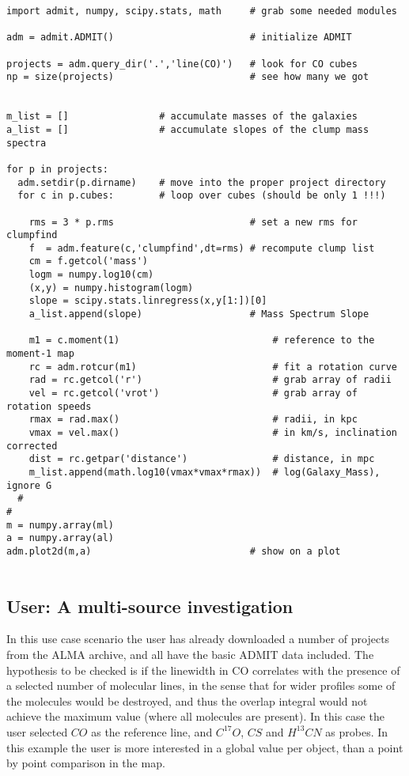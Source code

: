 \documentclass[preprint]{aastex} %
\begin{document}
\footnotesize
\begin{verbatim}
import admit, numpy, scipy.stats, math     # grab some needed modules

adm = admit.ADMIT()                        # initialize ADMIT

projects = adm.query_dir('.','line(CO)')   # look for CO cubes
np = size(projects)                        # see how many we got


m_list = []                # accumulate masses of the galaxies
a_list = []                # accumulate slopes of the clump mass spectra

for p in projects:
  adm.setdir(p.dirname)    # move into the proper project directory
  for c in p.cubes:        # loop over cubes (should be only 1 !!!)

    rms = 3 * p.rms                        # set a new rms for clumpfind
    f  = adm.feature(c,'clumpfind',dt=rms) # recompute clump list
    cm = f.getcol('mass')
    logm = numpy.log10(cm)
    (x,y) = numpy.histogram(logm)
    slope = scipy.stats.linregress(x,y[1:])[0]
    a_list.append(slope)                   # Mass Spectrum Slope

    m1 = c.moment(1)                           # reference to the moment-1 map
    rc = adm.rotcur(m1)                        # fit a rotation curve 
    rad = rc.getcol('r')                       # grab array of radii
    vel = rc.getcol('vrot')                    # grab array of rotation speeds
    rmax = rad.max()                           # radii, in kpc
    vmax = vel.max()                           # in km/s, inclination corrected
    dist = rc.getpar('distance')               # distance, in mpc
    m_list.append(math.log10(vmax*vmax*rmax))  # log(Galaxy_Mass), ignore G
  #
#
m = numpy.array(ml)
a = numpy.array(al)
adm.plot2d(m,a)                            # show on a plot


\end{verbatim}
\normalsize

\newpage

\subsection{User: A multi-source investigation}


In this use case scenario the user has already downloaded a number of
projects from the ALMA archive, and all have the basic ADMIT data
included. The hypothesis to be checked is if the linewidth in CO
correlates with the presence of a selected number of molecular lines,
in the sense that for wider profiles some of the molecules would be
destroyed, and thus the overlap integral would not achieve the maximum
value (where all molecules are present).  In this case the user
selected $CO$ as the reference line, and $C^{17}O$, $CS$ and
$H^{13}CN$ as probes. In this example the user is more interested in a
global value per object, than a point by point comparison in the map.
\end{document}
